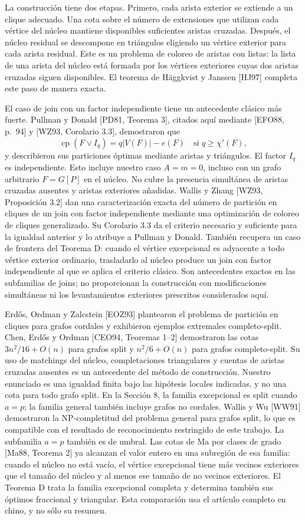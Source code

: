 \documentclass[spanish,11pt,a4paper]{article}
\begin{document}
La construcción tiene dos etapas. Primero, cada arista exterior se
extiende a un clique adecuado. Una cota sobre el número de extensiones
que utilizan cada vértice del núcleo mantiene disponibles suficientes
aristas cruzadas. Después, el núcleo residual se descompone en
triángulos eligiendo un vértice exterior para cada arista residual. Este
es un problema de coloreo de aristas con listas: la lista de una arista
del núcleo está formada por los vértices exteriores cuyas dos aristas
cruzadas siguen disponibles. El teorema de Häggkvist y Janssen
{[}HJ97{]} completa este paso de manera exacta.

El caso de join con un factor independiente tiene un antecedente clásico
más fuerte. Pullman y Donald {[}PD81, Teorema 3{]}, citados aquí
mediante {[}EFO88, p.~94{]} y {[}WZ93, Corolario 3.3{]}, demostraron que
\[
\operatorname{cp}(F\vee I_q)=q|V(F)|-e(F)
\quad\text{si }q\ge\chi'(F),
\] y describieron sus particiones óptimas mediante aristas y triángulos.
El factor \(I_q\) es independiente. Esto incluye nuestro caso \(A=m=0\),
incluso con un grafo arbitrario \(F=G[P]\) en el núcleo. No cubre la
presencia simultánea de aristas cruzadas ausentes y aristas exteriores
añadidas. Wallis y Zhang {[}WZ93, Proposición 3.2{]} dan una
caracterización exacta del número de partición en cliques de un join con
factor independiente mediante una optimización de coloreo de cliques
generalizado. Su Corolario 3.3 da el criterio necesario y suficiente
para la igualdad anterior y lo atribuye a Pullman y Donald. También
recupera un caso de frontera del Teorema D: cuando el vértice
excepcional es adyacente a todo vértice exterior ordinario, trasladarlo
al núcleo produce un join con factor independiente al que se aplica el
criterio clásico. Son antecedentes exactos en las subfamilias de joins;
no proporcionan la construcción con modificaciones simultáneas ni los
levantamientos exteriores prescritos considerados aquí.

Erdős, Ordman y Zalcstein {[}EOZ93{]} plantearon el problema de
partición en cliques para grafos cordales y exhibieron ejemplos
extremales completo-split. Chen, Erdős y Ordman {[}CEO94, Teoremas
1--2{]} demostraron las cotas \(3n^2/16+O(n)\) para grafos split y
\(n^2/6+O(n)\) para grafos completo-split. Su uso de matchings del
núcleo, completaciones triangulares y cuentas de aristas cruzadas
ausentes es un antecedente del método de construcción. Nuestro enunciado
es una igualdad finita bajo las hipótesis locales indicadas, y no una
cota para todo grafo split. En la Sección 8, la familia excepcional es
split cuando \(a=p\); la familia general también incluye grafos no
cordales. Wallis y Wu {[}WW91{]} demostraron la NP-completitud del
problema general para grafos split, lo que es compatible con el
resultado de reconocimiento restringido de este trabajo. La subfamilia
\(a=p\) también es de umbral. Las cotas de Ma por clases de grado
{[}Ma88, Teorema 2{]} ya alcanzan el valor entero en una subregión de
esa familia: cuando el núcleo no está vacío, el vértice excepcional
tiene más vecinos exteriores que el tamaño del núcleo y al menos ese
tamaño de no vecinos exteriores. El Teorema D trata la familia
excepcional completa y determina también sus óptimos fraccional y
triangular. Esta comparación usa el artículo completo en chino, y no
sólo su resumen.
\end{document}
